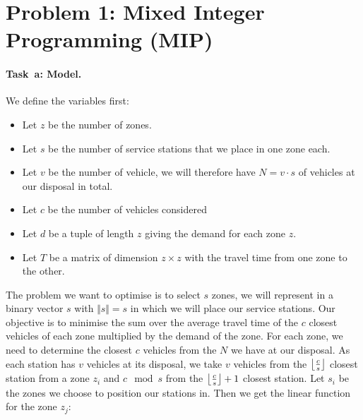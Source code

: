 \section*{Problem 1: Mixed Integer Programming (MIP)}

\newcommand{\SolverMIP}{\todo{Gurobi}\xspace}  %
\newcommand{\TimeoutMIP}{\todo{300.00}}  %
\newcommand{\norm}[1]{\Vert {#1} \Vert}

\paragraph{Task~a: Model.}
We define the variables first:
\begin{itemize}
  \item Let $z$ be the number of zones.
  \item Let $s$ be the number of service stations that we place in one zone each. 
  \item Let $v$ be the number of vehicle, we will therefore have $N = v \cdot s$ of vehicles at our disposal in total.
  \item Let $c$ be the number of vehicles considered
  \item Let $d$ be a tuple of length $z$ giving the demand for each zone $z$.
  \item Let $T$ be a matrix of dimension $z \times z$ with the travel time from one zone to the other.
\end{itemize}
The problem we want to optimise is to select $s$ zones, we will represent in a binary vector $s$ with $\norm{s} = s$ in which we will place our service stations. Our objective is to minimise the sum over the average travel time of the $c$ closest vehicles of each zone multiplied by the demand of the zone. For each zone, we need to determine the closest $c$ vehicles from the $N$ we have at our disposal. As each station has $v$ vehicles at its disposal, we take $v$ vehicles from the  $\left\lfloor\frac{c}{s}\right\rfloor$ closest station from a zone $z_i$ and $c \mod s$ from the $\left\lfloor\frac{c}{s}\right\rfloor + 1$ closest station. 
Let $s_i$ be the zones we choose to position our stations in. Then we get the linear function for the zone $z_j$: 

